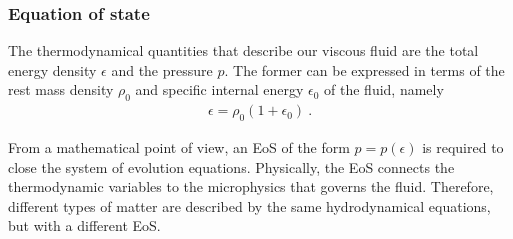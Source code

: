 \documentclass[prd,aps,twocolumn,floats,floatfix,nofootinbib,superscriptaddress] {revtex4-1}
\begin{document}
\subsubsection{Equation of state}

The thermodynamical quantities that describe our viscous fluid are the total energy density $\epsilon$ and the pressure $p$. The former can be expressed in terms of the rest mass density $\rho_0$ and specific internal energy $\epsilon_0$ of the fluid, namely
\begin{align}
    \epsilon = \rho_0 (1+\epsilon_0)~.
    \label{epsilon_definition}
\end{align}

From a mathematical point of view, an EoS of the form $p=p(\epsilon)$ is required to close the system of evolution equations. Physically, the EoS connects the thermodynamic variables to the microphysics that governs the fluid. Therefore, different types of matter are described by the same hydrodynamical equations, but with a different EoS.
\end{document}

